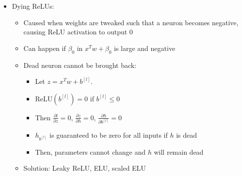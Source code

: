 \begin{itemize}
\begin{itemize}
\begin{itemize}
        \end{itemize}
    \end{itemize}
    \item Dying ReLUs:
    \begin{itemize}
        \item Caused when weights are tweaked such that a neuron becomes negative, causing ReLU activation to output 0
        \item Can happen if $\beta_0$ in $x^T w + \beta_0$ is large and negative
        \item Dead neuron cannot be brought back:
        \begin{itemize}
            \item Let $z = x^T w + b^{[l]}$.
            \item $\text{ReLU} \left( b^{[l]} \right) = 0$ if $b^{[l]} \leq 0$
            \item Then $\frac{\partial l}{\partial z} = 0$, $\frac{\partial z}{\partial h} = 0$, $\frac{\partial h}{\partial b^{[l]}} = 0$
            \item $h_{b^{[l]}}$ is guaranteed to be zero for all inputs if $h$ is dead
            \item Then, parameters cannot change and $h$ will remain dead
        \end{itemize}
        \item Solution: Leaky ReLU, ELU, scaled ELU
    \end{itemize}
\end{itemize}